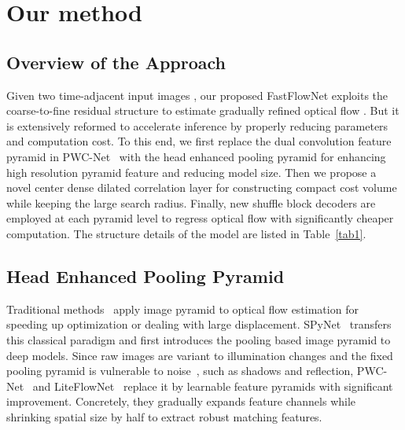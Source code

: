 \documentclass[letterpaper, 10 pt, conference]{ieeeconf}
\begin{document}
\section{Our method}
\subsection{Overview of the Approach}

Given two time-adjacent input images ,
our 
proposed FastFlowNet exploits the coarse-to-fine residual structure to estimate gradually refined optical flow .
But it is extensively reformed to accelerate inference by properly reducing parameters and computation cost. To this end, we first replace 
the dual convolution feature pyramid in PWC-Net~\cite{Sun_2018_CVPR} with the head enhanced pooling pyramid for enhancing high resolution pyramid feature and reducing model size. Then we propose a novel center dense dilated correlation layer for constructing compact cost volume while keeping the large search radius. Finally, new shuffle block decoders are employed at each pyramid level to regress optical flow with significantly cheaper computation.
The structure details of the model are listed in Table~\ref{tab1}.


\subsection{Head Enhanced Pooling Pyramid}
Traditional methods~\cite{Bouguet_2000, Brox_2011} apply image pyramid to optical flow estimation for speeding up optimization or dealing with large displacement. SPyNet~\cite{Ranjan_2017} transfers this  classical paradigm and first introduces the pooling based image pyramid to deep models. Since raw images are variant to illumination changes and the fixed pooling pyramid is vulnerable to noise~\cite{Brox_2004}, such as shadows and reflection, PWC-Net~\cite{Sun_2018_CVPR} and LiteFlowNet~\cite{Hui_2018_CVPR} replace it by learnable feature pyramids with significant improvement. Concretely, they gradually expands feature channels while shrinking spatial size by half to extract robust matching features.
\end{document}
